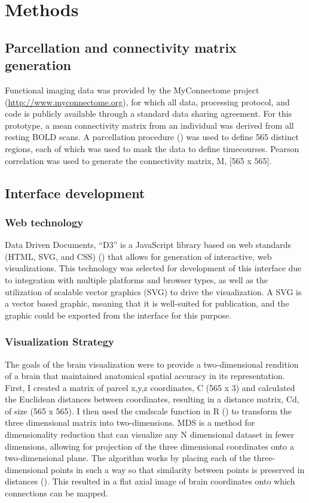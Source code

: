 \documentclass{report}
\begin{document}
\section{Methods}
\subsection{Parcellation and connectivity matrix generation}
Functional imaging data was provided by the MyConnectome project (\href{http://www.myconnectome.org}{http://www.myconnectome.org}), for which all data, processing protocol, and code is publicly available through a standard data sharing agreement. For this prototype, a mean connectivity matrix from an individual was derived from all resting BOLD scans.  A parcellation procedure (\cite{Gordon2016-gn}) was used to define 565 distinct regions, each of which was used to mask the data to define timecourses.  Pearson correlation was used to generate the connectivity matrix, M, [565 x 565]. 

\subsection{Interface development}
\subsubsection{Web technology}
Data Driven Documents, ``D3'' is a JavaScript library based on web standards (HTML, SVG, and CSS) (\cite{Bostock2011-ei}) that allows for generation of interactive, web visualizations.  This technology was selected for development of this interface due to integration with multiple platforms and browser types, as well as the utilization of scalable vector graphics (SVG) to drive the visualization.  A SVG is a vector based graphic, meaning that it is well-suited for publication, and the graphic could be exported from the interface for this purpose. 

\subsubsection{Visualization Strategy}
The goals of the brain visualization were to provide a two-dimensional rendition of a brain that maintained anatomical spatial accuracy in its representation.  First, I created a matrix of parcel x,y,z coordinates, C (565 x 3) and calculated the Euclidean distances between coordinates, resulting in a distance matrix, Cd, of size (565 x 565).  I then used the cmdscale function in R (\cite{Cox1996-rd}) to transform the three dimensional matrix into two-dimensions.  MDS is a method for dimensionality reduction that can visualize any N dimensional dataset in fewer dimensions, allowing for projection of the three dimensional coordinates onto a two-dimensional plane.  The algorithm works by placing each of the three-dimensional points in such a way so that similarity between points is preserved in distances (\cite{Cox1996-rd}).  This resulted in a flat axial image of brain coordinates onto which connections can be mapped. 
\end{document}
